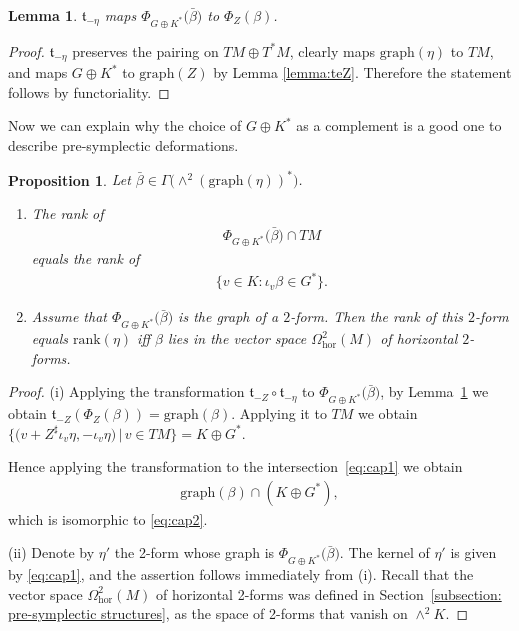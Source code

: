 \documentclass[pdftex]{sigma}
\numberwithin{equation}{section}
\newtheorem{Lemma}[Theorem]{Lemma}
\newtheorem{Proposition}[Theorem]{Proposition}
 { \theoremstyle{definition}
\newtheorem{Definition}[Theorem]{Definition}
\newtheorem{Remark}[Theorem]{Remark} }
\newcommand{\hor}{\mathrm{hor}}
\renewcommand{\t}{\mathfrak{t}}
\begin{document}
\begin{Lemma}\label{lemma:tme} $\t_{-\eta}$ maps $\Phi_{G\oplus K^*}\big(\bar{\beta}\big)$ to $\Phi_{Z}({\beta})$.
\end{Lemma}
\begin{proof}$\t_{-\eta}$ preserves the pairing on $TM\oplus T^*M$, clearly maps $\mathrm{graph}(\eta)$ to $TM$, and maps $G\oplus K^*$ to $\mathrm{graph}(Z)$ by Lemma \ref{lemma:teZ}. Therefore the statement follows by functoriality.
\end{proof}

Now we can explain why the choice of $G\oplus K^*$ as a complement is a good one to describe pre-symplectic deformations.

\begin{Proposition}\label{prop:rankgood} Let $\bar{\beta}\in \Gamma\big({\wedge}^2(\mathrm{graph}(\eta))^*\big)$.
\begin{enumerate}\itemsep=0pt
\item[$(i)$] The rank of
\begin{gather}\label{eq:cap1}
\Phi_{G\oplus K^*}\big(\bar{\beta}\big)\cap TM
\end{gather}
 equals the rank of
 \begin{gather}\label{eq:cap2}
\{v\in K\colon \iota_v\beta \in G^*\}.
\end{gather}
\item[$(ii)$] Assume that $\Phi_{G\oplus K^*}\big(\bar{\beta}\big)$ is the graph of a $2$-form. Then the rank of this $2$-form equals $\mathrm{rank}({\eta})$ if{f} $\beta$ lies in the vector space $\Omega^2_\hor(M)$ of horizontal $2$-forms.
\end{enumerate}
\end{Proposition}

\begin{proof} (i) Applying the transformation $\t_{-Z}\circ \t_{-\eta}$ to $\Phi_{G\oplus K^*}\big(\bar{\beta}\big)$, by Lemma~\ref{lemma:tme} we obtain $\t_{-Z}(\Phi_{Z}({\beta}))=\mathrm{graph}(\beta)$. Applying it to $TM$ we obtain $\big\{\big(v+Z^\sharp\iota_v\eta, -\iota_v\eta\big)\,|\,v\in {TM} \big\}=K\oplus G^*$.

Hence applying the transformation to the intersection~\eqref{eq:cap1} we obtain
\begin{gather*}\mathrm{graph}(\beta)\cap (K\oplus G^*),\end{gather*} which is isomorphic to \eqref{eq:cap2}.

(ii) Denote by $\eta'$ the 2-form whose graph is $\Phi_{G\oplus K^*}\big(\bar{\beta}\big)$. The kernel of $\eta'$ is given by \eqref{eq:cap1}, and the assertion follows immediately from (i). Recall that the vector space $\Omega^2_{\hor}(M)$ of horizontal 2-forms was defined in Section~\ref{subsection: pre-symplectic structures}, {as the space of 2-forms that vanish on $\wedge^2 K$.}
\end{proof}
\end{document}
